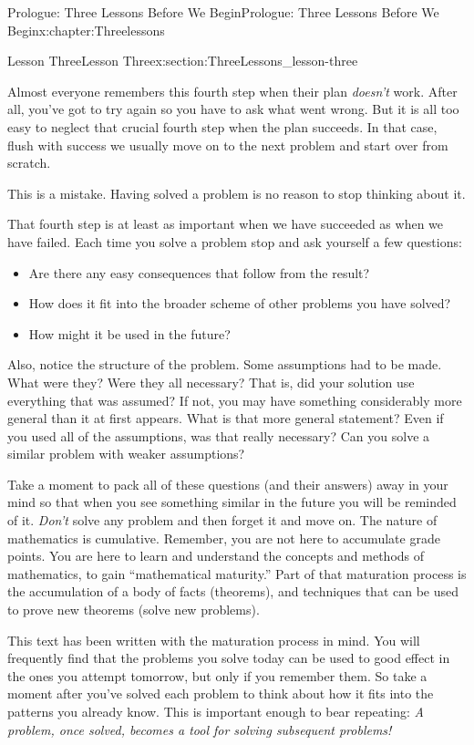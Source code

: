 \documentclass[oneside,10pt,]{book}
\numberwithin{equation}{section}
\begin{document}
\begin{chapterptx}{Prologue: Three Lessons Before We Begin}{}{Prologue: Three Lessons Before We Begin}{}{}{x:chapter:Threelessons}
\begin{sectionptx}{Lesson Three}{}{Lesson Three}{}{}{x:section:ThreeLessons_lesson-three}
\par
Almost everyone remembers this fourth step when their plan \emph{doesn't} work. After all, you've got to try again so you have to ask what went wrong. But it is all too easy to neglect that crucial fourth step when the plan succeeds. In that case, flush with success we usually move on to the next problem and start over from scratch.%
\par
This is a mistake. Having solved a problem is no reason to stop thinking about it.%
\par
That fourth step is at least as important when we have succeeded as when we have failed. Each time you solve a problem stop and ask yourself a few questions:%
\begin{itemize}[label=\textbullet]
\item{}Are there any easy consequences that follow from the result?%
\item{}How does it fit into the broader scheme of other problems you have solved?%
\item{}How might it be used in the future?%
\end{itemize}
%
\par
Also, notice the structure of the problem. Some assumptions had to be made. What were they? Were they all necessary? That is, did your solution use everything that was assumed? If not, you may have something considerably more general than it at first appears. What is that more general statement? Even if you used all of the assumptions, was that really necessary? Can you solve a similar problem with weaker assumptions?%
\par
Take a moment to pack all of these questions (and their answers) away in your mind so that when you see something similar in the future you will be reminded of it. \emph{Don't} solve any problem and then forget it and move on. The nature of mathematics is cumulative. Remember, you are not here to accumulate grade points. You are here to learn and understand the concepts and methods of mathematics, to gain ``mathematical maturity.'' Part of that maturation process is the accumulation of a body of facts (theorems), and techniques that can be used to prove new theorems (solve new problems).%
\par
This text has been written with the maturation process in mind. You will frequently find that the problems you solve today can be used to good effect in the ones you attempt tomorrow, but only if you remember them. So take a moment after you've solved each problem to think about how it fits into the patterns you already know. This is important enough to bear repeating: \emph{A problem, once solved, becomes a tool for solving subsequent problems!}%

\end{sectionptx}
\end{chapterptx}
\end{document}
